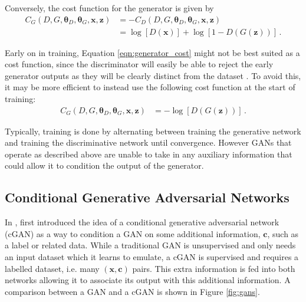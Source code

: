 \documentclass[11pt,a4paper,onecolumn]{report}
\begin{document}
\noindent Conversely, the cost function for the generator is given by
\begin{align}
  C_G(D, G, \bm{\theta}_D, \bm{\theta}_G, \bm{x}, \bm{z})
  &= -C_D(D, G, \bm{\theta}_D, \bm{\theta}_G, \bm{x}, \bm{z})\\
  &= \log[D(\bm{x})] + \log[1 - D(G(\bm{z}))] \,.
  \label{eqn:generator_cost}
\end{align}

Early on in training, Equation \ref{eqn:generator_cost} might not be best suited
as a cost function, since the discriminator will easily be able to reject the
early generator outputs as they will be clearly distinct from the dataset
\citep{Goodfellow2014}. To avoid this, it may be more efficient to instead use
the following cost function at the start of training:
\begin{align}
  C_G(D, G, \bm{\theta}_D, \bm{\theta}_G, \bm{x}, \bm{z})
  &= -\log[D(G(\bm{z}))]\,.
\end{align}

Typically, training is done by alternating between training the generative network
and training the discriminative network until convergence. However GANs that
operate as described above are unable to take in any auxiliary information that
could allow it to condition the output of the generator.

\subsection{Conditional Generative Adversarial Networks}
\label{sec:cgan}
In \citeyear{mirza_conditional_2014}, \citeauthor{mirza_conditional_2014} first
introduced the idea of a conditional generative adversarial network (cGAN) as a
way to condition a GAN on some additional information, \(\bm{c}\), such as a
label or related data. While a traditional GAN is unsupervised and only needs an
input dataset which it learns to emulate, a cGAN is supervised and requires a
labelled dataset, i.e. many \((\bm{x}, \bm{c})\) pairs. This extra information
is fed into both networks allowing it to associate its output with this
additional information. A comparison between a GAN
and a cGAN is shown in Figure \ref{fig:gans}.\\
\end{document}
